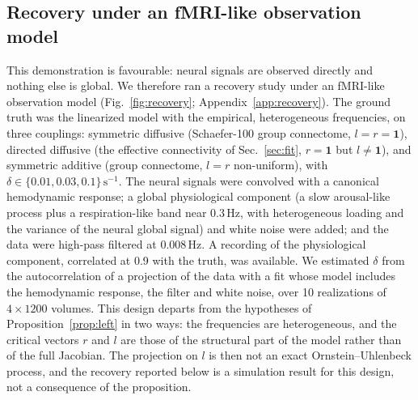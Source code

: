 \documentclass[aip,cha,reprint,amsmath,amssymb]{revtex4-2}
\theoremstyle{remark}
\newcommand{\one}{\mathbf 1}
\begin{document}
\subsection{Recovery under an fMRI-like observation model}\label{sec:recovery}

This demonstration is favourable: neural signals are observed directly and nothing else is global. We therefore ran a recovery study under an fMRI-like observation model (Fig.~\ref{fig:recovery}; Appendix~\ref{app:recovery}). The ground truth was the linearized model with the empirical, heterogeneous frequencies, on three couplings: symmetric diffusive (Schaefer-100 group connectome, $l=r=\one$), directed diffusive (the effective connectivity of Sec.~\ref{sec:fit}, $r=\one$ but $l\neq\one$), and symmetric additive (group connectome, $l=r$ non-uniform), with $\delta\in\{0.01,0.03,0.1\}\,\mathrm s^{-1}$. The neural signals were convolved with a canonical hemodynamic response; a global physiological component (a slow arousal-like process plus a respiration-like band near 0.3\,Hz, with heterogeneous loading and the variance of the neural global signal) and white noise were added; and the data were high-pass filtered at 0.008\,Hz. A recording of the physiological component, correlated at 0.9 with the truth, was available. We estimated $\delta$ from the autocorrelation of a projection of the data with a fit whose model includes the hemodynamic response, the filter and white noise, over 10 realizations of $4\times1200$ volumes. This design departs from the hypotheses of Proposition~\ref{prop:left} in two ways: the frequencies are heterogeneous, and the critical vectors $r$ and $l$ are those of the structural part of the model rather than of the full Jacobian. The projection on $l$ is then not an exact Ornstein--Uhlenbeck process, and the recovery reported below is a simulation result for this design, not a consequence of the proposition.
\end{document}
